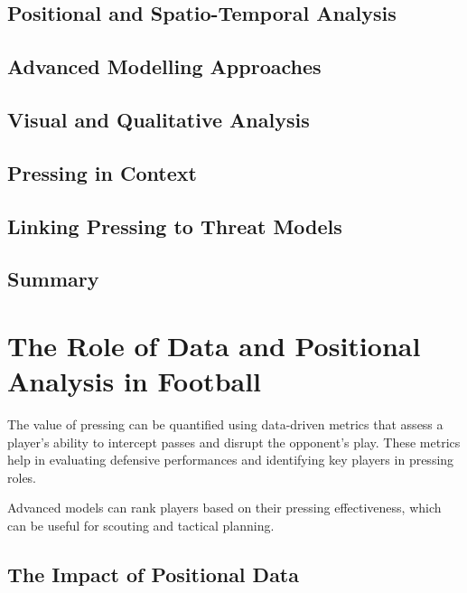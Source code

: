 \subsection{Positional and Spatio-Temporal Analysis}



\subsection{Advanced Modelling Approaches}



\subsection{Visual and Qualitative Analysis}




\subsection{Pressing in Context}




\subsection{Linking Pressing to Threat Models}




\subsection{Summary}


\section{The Role of Data and Positional Analysis in Football}

The value of pressing can be quantified using data-driven metrics that assess a player's ability to intercept passes and disrupt the opponent's play. These metrics help in evaluating defensive performances and identifying key players in pressing roles.

Advanced models can rank players based on their pressing effectiveness, which can be useful for scouting and tactical planning.

\subsection{The Impact of Positional Data}


